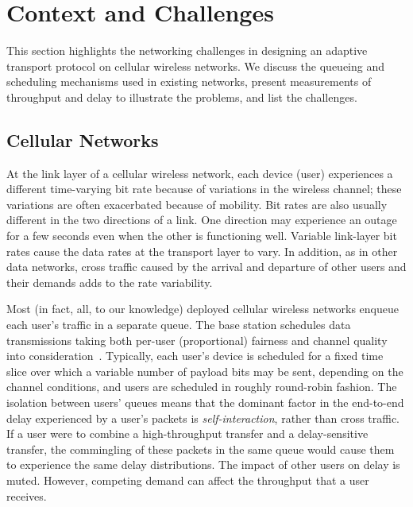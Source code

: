 \section{Context and Challenges}
\label{sprout:problem}

This section highlights the networking challenges in designing an
adaptive transport protocol on cellular wireless networks. We discuss
the queueing and scheduling mechanisms used in existing networks,
present measurements of throughput and delay to illustrate the
problems, and list the challenges.

\subsection{Cellular Networks}

At the link layer of a cellular wireless network, each device (user)
experiences a different time-varying bit rate because of variations in
the wireless channel; these variations are often exacerbated because of
mobility. Bit rates are also usually different in the two directions
of a link. One direction may experience an outage for a few seconds
even when the other is functioning well. Variable link-layer bit rates
cause the data rates at the transport layer to vary. In addition, as
in other data networks, cross traffic caused by the arrival and
departure of other users and their demands adds to the rate
variability.

Most (in fact, all, to our knowledge) deployed cellular wireless
networks enqueue each user's traffic in a separate queue. The base
station schedules data transmissions taking both per-user
(proportional) fairness and channel quality into
consideration~\cite{propfair}. Typically, each user's device is
scheduled for a fixed time slice over which a variable number of
payload bits may be sent, depending on the channel conditions, and
users are scheduled in roughly round-robin fashion. The isolation
between users' queues means that the dominant factor in the end-to-end
delay experienced by a user's packets is {\em self-interaction},
rather than cross traffic. If a user were to combine a high-throughput
transfer and a delay-sensitive transfer, the commingling of these
packets in the same queue would cause them to experience the same
delay distributions. The impact of other users on delay is
muted. However, competing demand can affect the throughput that a user
receives.

